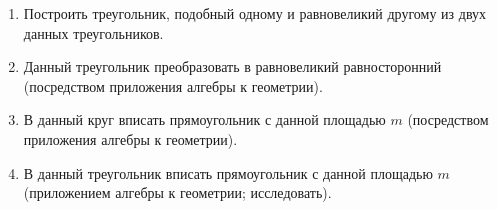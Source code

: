 {\begin{enumerate}
\item
Построить треугольник, подобный одному и равновеликий другому из двух данных треугольников.

\item
Данный треугольник преобразовать в равновеликий равносторонний (посредством приложения алгебры к геометрии).

\item
В данный круг вписать прямоугольник с данной площадью $m$ (посредством приложения алгебры к геометрии).

\item
В данный треугольник вписать прямоугольник с данной площадью $m$ (приложением алгебры к геометрии; исследовать).

\end{enumerate}

}

